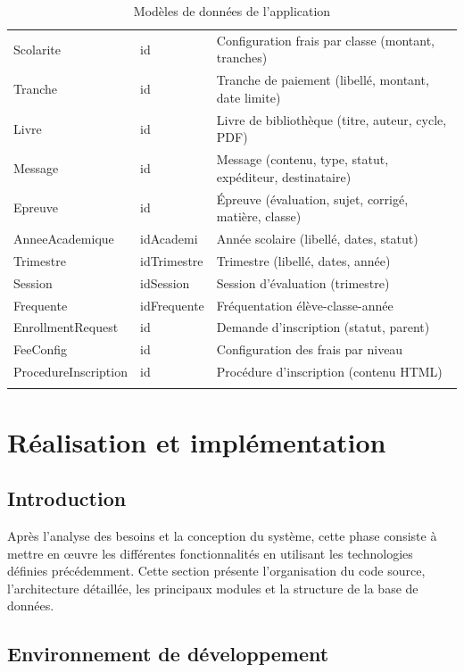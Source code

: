 \documentclass[12pt, a4paper]{report}
\begin{document}
\begin{longtable}{|p{3cm}|p{4cm}|p{6.5cm}|}
Scolarite & id & Configuration frais par classe (montant, tranches) \\
Tranche & id & Tranche de paiement (libellé, montant, date limite) \\
Livre & id & Livre de bibliothèque (titre, auteur, cycle, PDF) \\
Message & id & Message (contenu, type, statut, expéditeur, destinataire) \\
Epreuve & id & Épreuve (évaluation, sujet, corrigé, matière, classe) \\
AnneeAcademique & idAcademi & Année scolaire (libellé, dates, statut) \\
Trimestre & idTrimestre & Trimestre (libellé, dates, année) \\
Session & idSession & Session d'évaluation (trimestre) \\
Frequente & idFrequente & Fréquentation élève-classe-année \\
EnrollmentRequest & id & Demande d'inscription (statut, parent) \\
FeeConfig & id & Configuration des frais par niveau \\
ProcedureInscription & id & Procédure d'inscription (contenu HTML) \\
\hline
\caption{Modèles de données de l'application}
\label{tab:modeles}
\end{longtable}

\chapter{Réalisation et implémentation}

\section{Introduction}
Après l'analyse des besoins et la conception du système, cette phase consiste à mettre en œuvre les différentes fonctionnalités en utilisant les technologies définies précédemment. Cette section présente l'organisation du code source, l'architecture détaillée, les principaux modules et la structure de la base de données.

\section{Environnement de développement}
\end{document}
